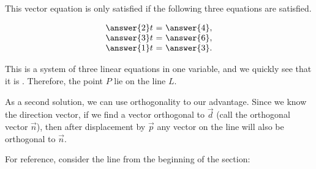 \documentclass{ximera}
\begin{document}
\begin{example}
  This vector equation is only satisfied if the following three equations are satisfied.

  \begin{equation*}
    \begin{array}{c@{~}c@{~}l}
      \answer{2}t &=& \answer{4}, \\
      \answer{3}t &=& \answer{6}, \\
      \answer{1}t &=& \answer{3}.
    \end{array}
  \end{equation*}

  This is a system of three linear equations in one variable, and we
  quickly see that it is . Therefore, the point $P$ 
  lie on the line $L$.


  As a second solution, we can use orthogonality to our advantage. Since we know the direction vector, if we find a vector orthogonal to $\vec{d}$ (call the orthogonal vector $\vec{n}$), then after displacement by $\vec{p}$ any vector on the line will also be orthogonal to $\vec{n}$.

  For reference, consider the line from the beginning of the section:

  \begin{center}
    \end{center}


\end{example}
\end{document}
